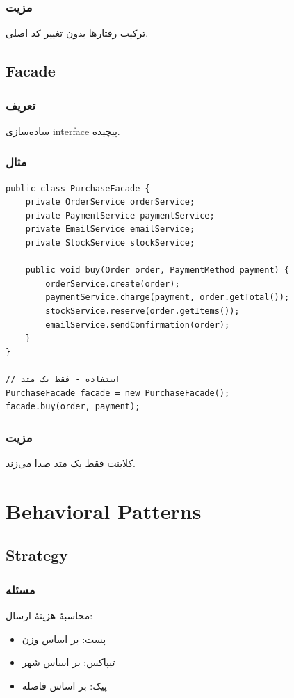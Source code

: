 \documentclass[12pt, a4paper]{article}
\begin{document}
\subsubsection{مزیت}
ترکیب رفتارها بدون تغییر کد اصلی.

\subsection{Facade}

\subsubsection{تعریف}
ساده‌سازی interface پیچیده.

\subsubsection{مثال}
\begin{lstlisting}
public class PurchaseFacade {
    private OrderService orderService;
    private PaymentService paymentService;
    private EmailService emailService;
    private StockService stockService;
    
    public void buy(Order order, PaymentMethod payment) {
        orderService.create(order);
        paymentService.charge(payment, order.getTotal());
        stockService.reserve(order.getItems());
        emailService.sendConfirmation(order);
    }
}

// استفاده - فقط یک متد
PurchaseFacade facade = new PurchaseFacade();
facade.buy(order, payment);
\end{lstlisting}

\subsubsection{مزیت}
کلاینت فقط یک متد صدا می‌زند.

\section{Behavioral Patterns}

\subsection{Strategy}

\subsubsection{مسئله}
محاسبهٔ هزینهٔ ارسال:
\begin{itemize}
    \item پست: بر اساس وزن
    \item تیپاکس: بر اساس شهر
    \item پیک: بر اساس فاصله
\end{itemize}
\end{document}
